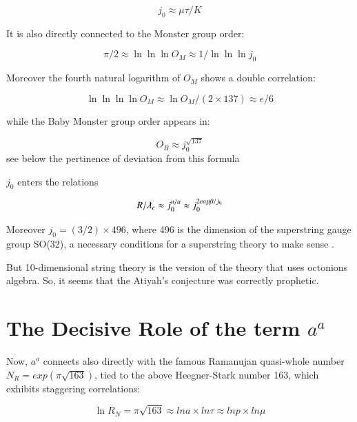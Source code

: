 \documentclass[a4paper,9pt]{article}
\begin{document}
\begin{equation}
j_0 \approx \mu \tau/ K
\end{equation}


It is also directly connected to the Monster group order:

 \begin{equation}
 \pi/2 \approx \ln{\ln{\ln{O_M}}} \approx 1/\ln{\ln{\ln{j_0}}}
\end{equation}

Moreover the fourth natural logarithm of $O_M$ shows a double correlation:

 \begin{equation}
 \ln{\ln{\ln{\ln{O_M}}}} \approx \ln{O_M} /(2\times 137) \approx e/6
\end{equation}

while the Baby Monster group order appears in:

\begin{equation}
 O_B \approx j_0^{\sqrt{137}}
\end{equation}
see below the pertinence of deviation from this formula

$j_0$ enters the relations
 
 \begin{equation}
 R/\lambdabar_e \approx j_0^{n/a} \approx j_0^{2eap\beta/j_0} 
\end{equation}

Moreover $j_0 = (3/2) \times 496$, where 496 is the dimension of the superstring gauge group SO(32), a necessary conditions for a superstring theory to make sense \cite{Green}.


But 10-dimensional string theory is the version of the theory that uses octonions algebra. So, it seems that the Atiyah's conjecture was correctly prophetic.








\section{The Decisive Role of the term $a^a$ }





Now, $a^a$ connects also directly with the famous Ramanujan quasi-whole number $N_R = exp(\pi \sqrt{163})$, tied to the above Heegner-Stark number 163, which exhibits staggering correlations:



\begin{equation}
\ln{R_N} = \pi \sqrt{163}  \approx lna \times ln\tau  \approx  lnp \times ln\mu
\end{equation}
\end{document}

